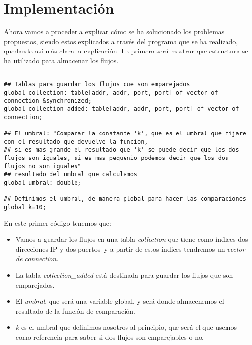 \chapter{Implementación}

Ahora vamos a proceder a explicar cómo se ha solucionado los problemas 
propuestos, siendo estos explicados a través del programa que se ha 
realizado, quedando así más clara la explicación.
\intro
\noindent Lo primero será mostrar que estructura se ha utilizado para almacenar los 
flujos.
\intro
\begin{lstlisting}[style=CodigoC]

## Tablas para guardar los flujos que son emparejados
global collection: table[addr, addr, port, port] of vector of connection &synchronized;
global collection_added: table[addr, addr, port, port] of vector of connection;

## El umbral: "Comparar la constante 'k', que es el umbral que fijare con el resultado que devuelve la funcion,
## si es mas grande el resultado que 'k' se puede decir que los dos flujos son iguales, si es mas pequenio podemos decir que los dos flujos no son iguales"
## resultado del umbral que calculamos
global umbral: double;

## Definimos el umbral, de manera global para hacer las comparaciones
global k=10;

\end{lstlisting}

\noindent En este primer código tenemos que: 
\begin{itemize}
\item Vamos a guardar los flujos en una tabla \textit{collection} que tiene como índices 
dos direcciones IP y dos puertos, y a partir de estos indices tendremos un \textit{vector de connection}.
\item La tabla \textit{collection\_added} está destinada para guardar los flujos que son 
emparejados.
\item El \textit{umbral}, que será una variable global, y será donde almacenemos el resultado 
de la función de comparación.
\item \textit{k} es el umbral que definimos nosotros al principio, que será el que usemos como 
referencia para saber si dos flujos son emparejables o no.
\end{itemize}

